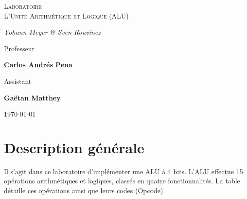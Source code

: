 \documentclass[a4paper]{article}
\begin{document}
\begin{titlepage}
	\centering
	
	{\scshape\LARGE \color{Monokaimagenta} Laboratoire \\ L'Unité Arithmétique et Logique (ALU) \par}
	\vspace{1cm}
	
	{\Large\itshape Yohann Meyer \& Sven Rouvinez\par}
	\vfill
	Professeur\par
	\textbf{Carlos Andrés Pena}\par
	\vspace{1cm}
	Assistant\par
	\textbf{Gaëtan Matthey}
	
	\vfill

	{\large \today\par}
\end{titlepage}



\section{Description générale}
\paragraph{}
Il s’agit dans ce laboratoire d’implémenter une ALU à 4 bits. L’ALU effectue 15 opérations arithmétiques et logiques, classés en quatre fonctionnalités. La table détaille ces opérations ainsi que leurs codes (Opcode).
\end{document}
